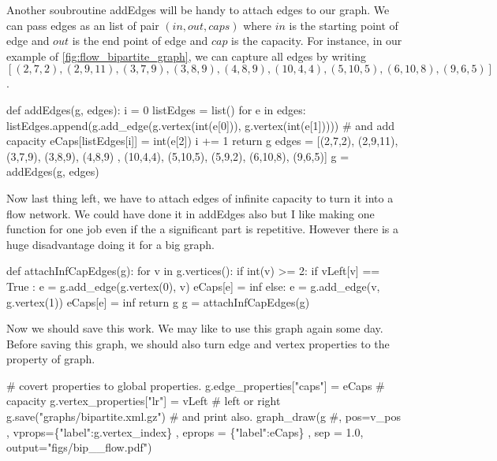 \documentclass[10pt,a4paper]{article}%
\begin{document}
\nwendcode{}Another soubroutine {\Tt{}addEdges\nwendquote} will be handy to attach edges to our graph.
We can pass edges as an list of pair $(in, out, caps)$ where $in$ is the
starting point of edge and $out$ is the end point of edge and $cap$ is the
capacity. For instance, in our example of \ref{fig:flow_bipartite_graph}, we can
capture all edges by writing $[(2,7,2), (2,9,11), (3,7,9), (3,8,9), (4,8,9),
(10,4,4), (5,10,5), (6,10,8), (9,6,5)]$.

\nwenddocs{}\plusendmoddef\nwstartdeflinemarkup\nwenddeflinemarkup
def addEdges(g, edges):
    i = 0
    listEdges = list()
    for e in edges:
        listEdges.append(g.add_edge(g.vertex(int(e[0])), g.vertex(int(e[1]))))
        # and add capacity
        eCaps[listEdges[i]] = int(e[2])
        i += 1
    return g
\eatline
\nwendcode{}\nwdocspar
\nwenddocs{}\plusendmoddef\nwstartdeflinemarkup\nwenddeflinemarkup
edges = [(2,7,2), (2,9,11), (3,7,9), (3,8,9), (4,8,9)
        , (10,4,4), (5,10,5), (5,9,2), (6,10,8), (9,6,5)]
g = addEdges(g, edges)

\nwendcode{}Now last thing left, we have to attach edges of infinite capacity to turn it
into a flow network. We could have done it in {\Tt{}addEdges\nwendquote} also but I like
making one function for one job even if the a significant part is repetitive.
However there is a huge disadvantage doing it for a big graph.

\nwenddocs{}\plusendmoddef\nwstartdeflinemarkup\nwenddeflinemarkup
def attachInfCapEdges(g):
    for v in g.vertices():
        if int(v) >= 2:
            if vLeft[v] == True :
                e = g.add_edge(g.vertex(0), v)
                eCaps[e] = inf
            else:
                e = g.add_edge(v, g.vertex(1))
                eCaps[e] = inf
    return g
\eatline
\nwendcode{}\nwdocspar
\nwenddocs{}\plusendmoddef\nwstartdeflinemarkup\nwenddeflinemarkup
g = attachInfCapEdges(g)


\nwendcode{}Now we should save this work. We may like to use this graph again some day.
Before saving this graph, we should also turn edge and vertex properties to the
property of graph.


\nwenddocs{}\endmoddef\nwstartdeflinemarkup\nwenddeflinemarkup
# covert properties to global properties.
g.edge_properties["caps"] = eCaps # capacity
g.vertex_properties["lr"] = vLeft # left or right
g.save("graphs/bipartite.xml.gz")
# and print also.
graph_draw(g #, pos=v_pos
    , vprops=\{"label":g.vertex_index\}
    , eprops = \{"label":eCaps\}
    , sep = 1.0, output="figs/bip__flow.pdf")
\end{document}
